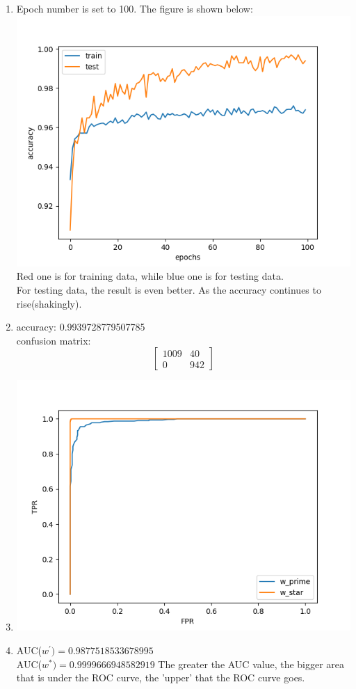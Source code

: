 \documentclass[11pt, oneside]{article}   	%
\begin{document}
\begin{enumerate}
\begin{enumerate}
  \item	%
    Epoch number is set to 100. The figure is shown below:\\
    \includegraphics[width=15cm]{2.1b.png}\\
    Red one is for training data, while blue one is for testing data.\\
    For testing data, the result is even better. As the accuracy continues to rise(shakingly).
  \item	%
    accuracy:  0.9939728779507785\\
    confusion matrix:
    \[
    \left[
      \begin{array}{cc}
	1009	&	40\\
	0	&	942
      \end{array}
      \right]
    \]
  \item %
    \includegraphics[width=15cm]{2.1d.png}
  \item %
    AUC($ w^\prime) = 0.9877518533678995$\\
    AUC($ w^*) = 0.9999666948582919$
    The greater the AUC value, the bigger area that is under the ROC curve, the 'upper' that the ROC curve goes.
  \end{enumerate}


\end{enumerate}
\end{document}

